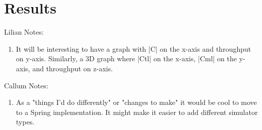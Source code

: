 \chapter{Results}
\label{cha:Results}

Lilian Notes:
\begin{enumerate}
\item It will be interesting to have a graph with |C| on the x-axis and throughput on y-axis. Similarly, a 3D graph where  |Ctl| on the x-axis, |Cml| on the y-axis, and throughput on z-axis.
\end{enumerate}

Callum Notes:
\begin{enumerate}
\item As a "things I'd do differently" or "changes to make" it would be cool to move to a Spring implementation. It might make it easier to add different simulator types.
\end{enumerate}
